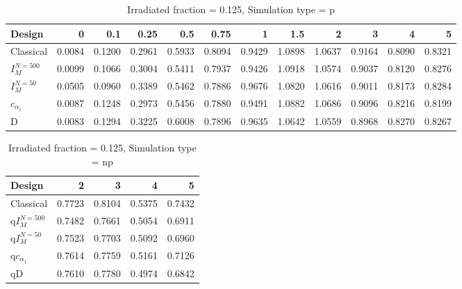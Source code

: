 \documentclass[a4paper]{article}
\begin{document}
\begin{table}[ht]
\centering
\begin{tabular}{lrrrrrrrrrrr}
  \hline
Design & 0 & 0.1 & 0.25 & 0.5 & 0.75 & 1 & 1.5 & 2 & 3 & 4 & 5 \\ 
  \hline
Classical & 0.0084 & 0.1200 & 0.2961 & 0.5933 & 0.8094 & 0.9429 & 1.0898 & 1.0637 & 0.9164 & 0.8090 & 0.8321 \\ 
  $I_M^{N=500}$ & 0.0099 & 0.1066 & 0.3004 & 0.5411 & 0.7937 & 0.9426 & 1.0918 & 1.0574 & 0.9037 & 0.8120 & 0.8276 \\ 
  $I_M^{N=50}$ & 0.0505 & 0.0960 & 0.3389 & 0.5462 & 0.7886 & 0.9676 & 1.0820 & 1.0616 & 0.9011 & 0.8173 & 0.8284 \\ 
  $c_{\alpha_1}$ & 0.0087 & 0.1248 & 0.2973 & 0.5456 & 0.7880 & 0.9491 & 1.0882 & 1.0686 & 0.9096 & 0.8216 & 0.8199 \\ 
  D & 0.0083 & 0.1294 & 0.3225 & 0.6008 & 0.7896 & 0.9635 & 1.0642 & 1.0559 & 0.8968 & 0.8270 & 0.8267 \\ 
   \hline
\end{tabular}
\caption{Irradiated fraction = 0.125, Simulation type = p} 
\end{table}

\begin{table}[ht]
\centering
\begin{tabular}{lrrrr}
  \hline
Design & 2 & 3 & 4 & 5 \\ 
  \hline
Classical & 0.7723 & 0.8104 & 0.5375 & 0.7432 \\ 
  q$I_M^{N=500}$ & 0.7482 & 0.7661 & 0.5054 & 0.6911 \\ 
  q$I_M^{N=50}$ & 0.7523 & 0.7703 & 0.5092 & 0.6960 \\ 
  q$c_{\alpha_1}$ & 0.7614 & 0.7759 & 0.5161 & 0.7126 \\ 
  qD & 0.7610 & 0.7780 & 0.4974 & 0.6842 \\ 
   \hline
\end{tabular}
\caption{Irradiated fraction = 0.125, Simulation type = np} 
\end{table}
\end{document}
